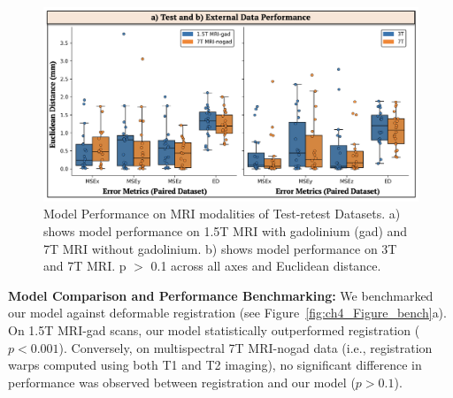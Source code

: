 \begin{figure}[hbt!]
    \centering
    \includegraphics[width=1\linewidth]{figs/ch4_Figure_errs2.png}
    \caption{Model Performance on MRI modalities of Test-retest Datasets. a) shows model performance on 1.5T MRI with gadolinium (gad) and 7T MRI without gadolinium. b) shows model performance on 3T and 7T MRI. p \(>\) 0.1 across all axes and Euclidean distance. }
    \label{fig:ch4_Figure_errs}
\end{figure}

\textbf{Model Comparison and Performance Benchmarking:} We benchmarked our model against deformable registration (see Figure~\ref{fig:ch4_Figure_bench}a). On 1.5T MRI-gad scans, our model statistically outperformed registration ($p < 0.001$). Conversely, on multispectral 7T MRI-nogad data (i.e., registration warps computed using both T1 and T2 imaging), no significant difference in performance was observed between registration and our model ($p > 0.1$).

